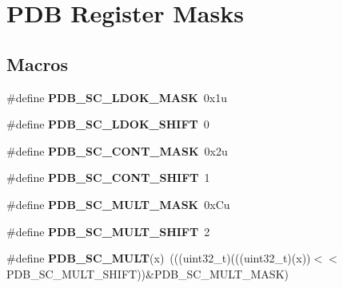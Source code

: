 \hypertarget{group__PDB__Register__Masks}{}\section{P\+DB Register Masks}
\label{group__PDB__Register__Masks}
\subsection*{Macros}
\begin{DoxyCompactItemize}
\item 
\#define {\bfseries P\+D\+B\+\_\+\+S\+C\+\_\+\+L\+D\+O\+K\+\_\+\+M\+A\+SK}~0x1u\hypertarget{group__PDB__Register__Masks_gabe6a0c2a0e00e0d01b3b94ca8cd90728}{}\label{group__PDB__Register__Masks_gabe6a0c2a0e00e0d01b3b94ca8cd90728}

\item 
\#define {\bfseries P\+D\+B\+\_\+\+S\+C\+\_\+\+L\+D\+O\+K\+\_\+\+S\+H\+I\+FT}~0\hypertarget{group__PDB__Register__Masks_ga8766bd357685d2ec463f51e0b08c6080}{}\label{group__PDB__Register__Masks_ga8766bd357685d2ec463f51e0b08c6080}

\item 
\#define {\bfseries P\+D\+B\+\_\+\+S\+C\+\_\+\+C\+O\+N\+T\+\_\+\+M\+A\+SK}~0x2u\hypertarget{group__PDB__Register__Masks_gaa723ee73c65ba7680ef3c9de87b8a635}{}\label{group__PDB__Register__Masks_gaa723ee73c65ba7680ef3c9de87b8a635}

\item 
\#define {\bfseries P\+D\+B\+\_\+\+S\+C\+\_\+\+C\+O\+N\+T\+\_\+\+S\+H\+I\+FT}~1\hypertarget{group__PDB__Register__Masks_ga49a81fd7584f9957362d71ac5f4d12bb}{}\label{group__PDB__Register__Masks_ga49a81fd7584f9957362d71ac5f4d12bb}

\item 
\#define {\bfseries P\+D\+B\+\_\+\+S\+C\+\_\+\+M\+U\+L\+T\+\_\+\+M\+A\+SK}~0x\+Cu\hypertarget{group__PDB__Register__Masks_ga86e3ec0c9f5ec6d0bbc1ebcf20774b38}{}\label{group__PDB__Register__Masks_ga86e3ec0c9f5ec6d0bbc1ebcf20774b38}

\item 
\#define {\bfseries P\+D\+B\+\_\+\+S\+C\+\_\+\+M\+U\+L\+T\+\_\+\+S\+H\+I\+FT}~2\hypertarget{group__PDB__Register__Masks_gaaf1dfea7eddb56850efd85b75d659ef8}{}\label{group__PDB__Register__Masks_gaaf1dfea7eddb56850efd85b75d659ef8}

\item 
\#define {\bfseries P\+D\+B\+\_\+\+S\+C\+\_\+\+M\+U\+LT}(x)~(((uint32\+\_\+t)(((uint32\+\_\+t)(x))$<$$<$P\+D\+B\+\_\+\+S\+C\+\_\+\+M\+U\+L\+T\+\_\+\+S\+H\+I\+FT))\&P\+D\+B\+\_\+\+S\+C\+\_\+\+M\+U\+L\+T\+\_\+\+M\+A\+SK)\hypertarget{group__PDB__Register__Masks_ga52e674d4841cbe8d87374deadb69b45f}{}\label{group__PDB__Register__Masks_ga52e674d4841cbe8d87374deadb69b45f}


\end{DoxyCompactItemize}
